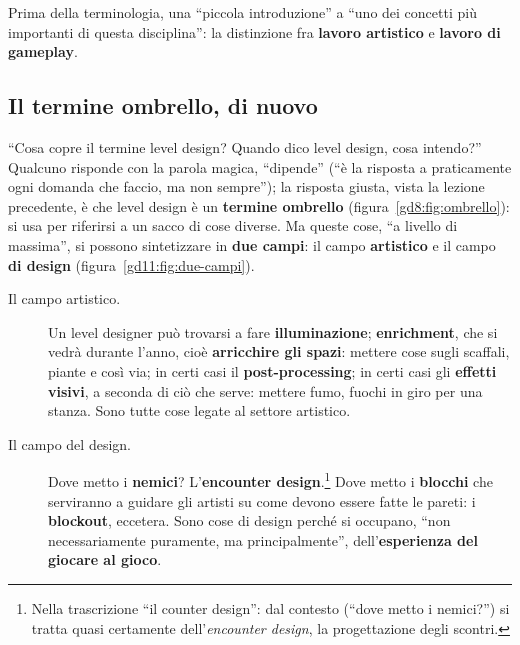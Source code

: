 Prima della terminologia, una ``piccola introduzione'' a ``uno dei concetti più
importanti di questa disciplina'': la distinzione fra \textbf{lavoro
artistico} e \textbf{lavoro di gameplay}.

\subsection{Il termine ombrello, di nuovo}

``Cosa copre il termine level design? Quando dico level design, cosa intendo?''
Qualcuno risponde con la parola magica, ``dipende'' (``è la risposta a
praticamente ogni domanda che faccio, ma non sempre'');
la risposta giusta, vista la lezione precedente, è che level design è un
\textbf{termine ombrello} (figura~\ref{gd8:fig:ombrello}): si usa per riferirsi a
un sacco di cose diverse. Ma queste cose, ``a livello di massima'', si possono
sintetizzare in \textbf{due campi}: il campo \textbf{artistico} e il campo
\textbf{di design} (figura~\ref{gd11:fig:due-campi}).

\begin{description}
  \item[Il campo artistico.] Un level designer può trovarsi a fare
        \textbf{illuminazione}; \textbf{enrichment}, che si vedrà durante
        l'anno, cioè \textbf{arricchire gli spazi}: mettere cose sugli
        scaffali, piante e così via; in certi casi il
        \textbf{post-processing}; in certi casi gli \textbf{effetti visivi}, a
        seconda di ciò che serve: mettere fumo, fuochi in giro per una stanza.
        Sono tutte cose legate al settore artistico.
  \item[Il campo del design.] Dove metto i \textbf{nemici}? L'\textbf{encounter
        design}.\footnote{Nella trascrizione ``il counter design'': dal
        contesto (``dove metto i nemici?'') si tratta quasi certamente
        dell'\emph{encounter design}, la progettazione degli scontri.} Dove
        metto i \textbf{blocchi} che serviranno a guidare gli artisti su come
        devono essere fatte le pareti: i \textbf{blockout}, eccetera. Sono
        cose di design perché si occupano, ``non necessariamente puramente, ma
        principalmente'', dell'\textbf{esperienza del giocare al gioco}.
\end{description}

